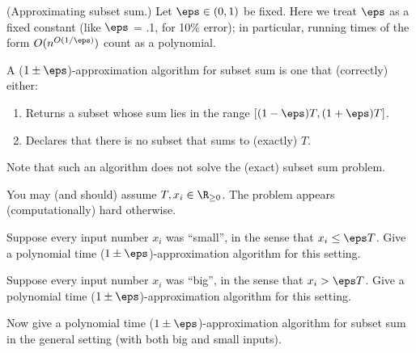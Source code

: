 \documentclass{article}
\begin{document}
\setcounter{section}{11}
\setcounter{exercise}{8}

 (Approximating subset sum.) Let $ \eps\in (0, 1)$ be fixed.
Here we treat $ \eps $ as a fixed constant (like $ \eps $ = .1, for 10\% error); in particular, running times of the form $ O(n^{O(1/\eps)}) $ count as a polynomial.

A ($ 1 \pm \eps $)-approximation algorithm for subset sum is one that (correctly) either: \begin{enumerate}
  \item Returns a subset whose sum lies in the range $[( 1-\eps )T , ( 1+\eps )T ]$.
  \item Declares that there is no subset that sums to (exactly) $T$.
\end{enumerate}
Note that such an algorithm does not solve the (exact) subset sum problem.
\begin{note}
  You may (and should) assume $ T,x_i\in\R_{\geq 0} $. The problem appears (computationally) hard otherwise.
\end{note}

\begin{subexercise}
  Suppose every input number $ x_i $ was ``small'', in the sense that $ x_i \leq \eps T $. Give a polynomial time ($ 1\pm \eps $)-approximation algorithm for this setting.
\end{subexercise}

\begin{solution}

\end{solution}
\pagebreak

\begin{subexercise}
  Suppose every input number $ x_i $ was ``big'', in the sense that $ x_i > \eps T $. Give a polynomial time ($ 1\pm \eps $)-approximation algorithm for this setting.
\end{subexercise}

\begin{solution}

\end{solution}
\pagebreak

\begin{subexercise}
  Now give a polynomial time ($ 1\pm \eps $)-approximation algorithm for subset sum in the general setting (with both big and small inputs).
\end{subexercise}

\begin{solution}

\end{solution}
\pagebreak
\end{document}
